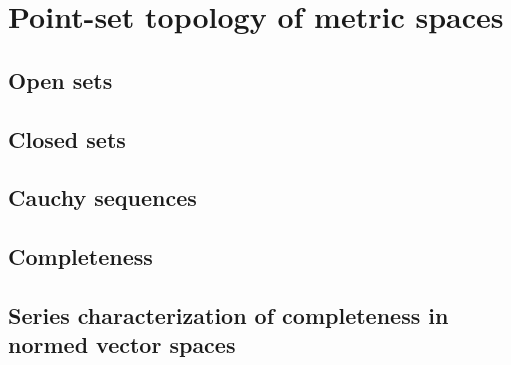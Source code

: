 \section{Point-set topology of metric spaces}

\subsection{Open sets}

\subsection{Closed sets}

\subsection{Cauchy sequences}

\subsection{Completeness}

\subsection{Series characterization of completeness in normed vector spaces}
